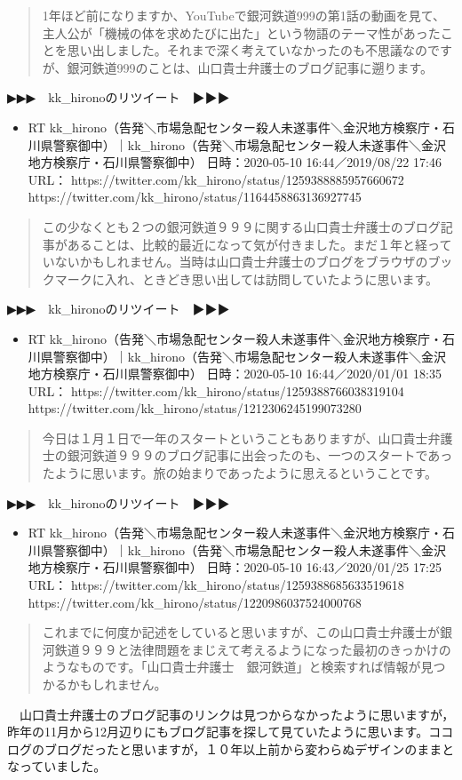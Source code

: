 \documentclass[]{ltjarticle}
\providecommand{\tightlist}{%
  \setlength{\itemsep}{0pt}\setlength{\parskip}{0pt}}
\begin{document}
\begin{quote}
1年ほど前になりますか、YouTubeで銀河鉄道999の第1話の動画を見て、主人公が「機械の体を求めたびに出た」という物語のテーマ性があったことを思い出しました。それまで深く考えていなかったのも不思議なのですが、銀河鉄道999のことは、山口貴士弁護士のブログ記事に遡ります。
\end{quote}

▶▶▶　kk\_hironoのリツイート　▶▶▶

\begin{itemize}
\tightlist
\item
  RT
  kk\_hirono（告発＼市場急配センター殺人未遂事件＼金沢地方検察庁・石川県警察御中）｜kk\_hirono（告発＼市場急配センター殺人未遂事件＼金沢地方検察庁・石川県警察御中）
  日時：2020-05-10 16:44／2019/08/22 17:46 URL：
  https://twitter.com/kk\_hirono/status/1259388885957660672
  https://twitter.com/kk\_hirono/status/1164458863136927745
\end{itemize}

\begin{quote}
この少なくとも２つの銀河鉄道９９９に関する山口貴士弁護士のブログ記事があることは、比較的最近になって気が付きました。まだ１年と経っていないかもしれません。当時は山口貴士弁護士のブログをブラウザのブックマークに入れ、ときどき思い出しては訪問していたように思います。
\end{quote}

▶▶▶　kk\_hironoのリツイート　▶▶▶

\begin{itemize}
\tightlist
\item
  RT
  kk\_hirono（告発＼市場急配センター殺人未遂事件＼金沢地方検察庁・石川県警察御中）｜kk\_hirono（告発＼市場急配センター殺人未遂事件＼金沢地方検察庁・石川県警察御中）
  日時：2020-05-10 16:44／2020/01/01 18:35 URL：
  https://twitter.com/kk\_hirono/status/1259388766038319104
  https://twitter.com/kk\_hirono/status/1212306245199073280
\end{itemize}

\begin{quote}
今日は１月１日で一年のスタートということもありますが、山口貴士弁護士の銀河鉄道９９９のブログ記事に出会ったのも、一つのスタートであったように思います。旅の始まりであったように思えるということです。
\end{quote}

▶▶▶　kk\_hironoのリツイート　▶▶▶

\begin{itemize}
\tightlist
\item
  RT
  kk\_hirono（告発＼市場急配センター殺人未遂事件＼金沢地方検察庁・石川県警察御中）｜kk\_hirono（告発＼市場急配センター殺人未遂事件＼金沢地方検察庁・石川県警察御中）
  日時：2020-05-10 16:43／2020/01/25 17:25 URL：
  https://twitter.com/kk\_hirono/status/1259388685633519618
  https://twitter.com/kk\_hirono/status/1220986037524000768
\end{itemize}

\begin{quote}
これまでに何度か記述をしていると思いますが、この山口貴士弁護士が銀河鉄道９９９と法律問題をまじえて考えるようになった最初のきっかけのようなものです。「山口貴士弁護士　銀河鉄道」と検索すれば情報が見つかるかもしれません。
\end{quote}

　山口貴士弁護士のブログ記事のリンクは見つからなかったように思いますが，昨年の11月から12月辺りにもブログ記事を探して見ていたように思います。ココログのブログだったと思いますが，１０年以上前から変わらぬデザインのままとなっていました。
\end{document}
